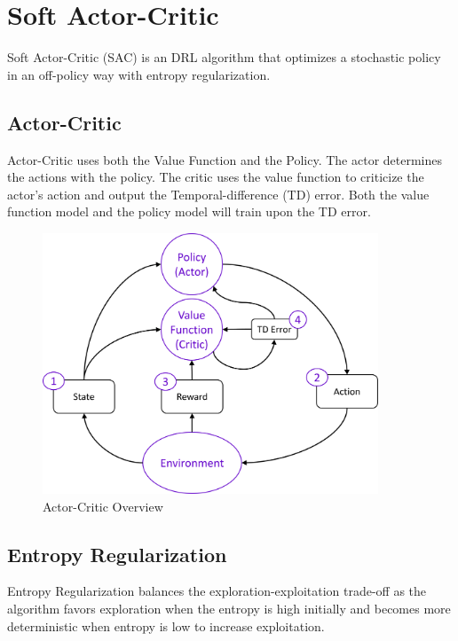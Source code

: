 \section{Soft Actor-Critic}
Soft Actor-Critic (SAC) is an DRL algorithm that optimizes a stochastic policy in an off-policy way with entropy regularization.
\subsection{Actor-Critic}
Actor-Critic uses both the Value Function and the Policy. The actor determines the actions with the policy. The critic uses the value function to criticize the actor's action and output the Temporal-difference (TD) error. Both the value function model and the policy model will train upon the TD error.
\begin{figure}[htb]
    \centering
    \includegraphics[width=10cm]{images/actor_critic.png}
    \caption{Actor-Critic Overview}
    \label{fig:actor-critic}
\end{figure}

\subsection{Entropy Regularization}
Entropy Regularization balances the exploration-exploitation trade-off as the algorithm favors exploration when the entropy is high initially and becomes more deterministic when entropy is low to increase exploitation.